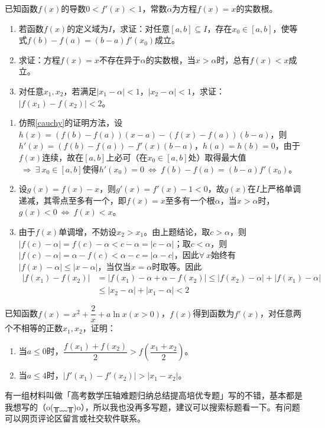 \begin{que}
	已知函数$f(x)$的导数$0<f'(x)<1$，常数$\alpha$为方程$f(x)=x$的实数根。
	\begin{enumerate}
		\item 若函数$f(x)$的定义域为$I$，求证：对任意$[a,b]\subseteq I$，存在$x_0\in[a,b]$，使等式$f(b)-f(a)=(b-a)f'(x_0)$成立。
		\item 求证：方程$f(x)=x$不存在异于$\alpha$的实数根，当$x>\alpha$时，总有$f(x)<x$成立。
		\item 对任意$x_1,x_2$，若满足$|x_1-\alpha|<1$，$|x_2-\alpha|<1$，求证：$|f(x_1)-f(x_2)|<2$。
	\end{enumerate}
\end{que}
\sol \begin{enumerate}
	\item 仿照\ref{cauchy}的证明方法，设$h(x)=(f(b)-f(a))(x-a)-(f(x)-f(a))(b-a)$，则$h'(x)=(f(b)-f(a))-f'(x)(b-a)$，$h(a)=h(b)=0$，由于$f(x)$连续，故在$[a,b]$上必可（在$x_0\in[a,b]$处）取得最大值$\ \Rightarrow\ \exists\ x_0\in[a,b]$使得$h'(x_0)=0\ \Leftrightarrow\ f(b)-f(a)=(b-a)f'(x_0)$。
	\item 设$g(x)=f(x)-x$，则$g'(x)=f'(x)-1<0$，故$g(x)$在$I$上严格单调递减，其零点至多有一个，即$f(x)=x$至多有一个根$\alpha$，当$x>\alpha$时，$g(x)<0\ \Leftrightarrow\ f(x)<x$。
	\item 由于$f(x)$单调增，不妨设$x_2>x_1$。由上题结论，取$c>\alpha$，则$|f(c)-\alpha|=f(c)-\alpha<c-\alpha=|c-\alpha|$；取$c<\alpha$，则$|f(c)-\alpha|=\alpha-f(c)<\alpha-c=|\alpha-c|$，因此$\forall\ x$始终有$|f(x)-\alpha|\leqslant |x-\alpha|$，当仅当$x=\alpha$时取等。因此$$\begin{aligned}
	|f(x_1)-f(x_2)|&=|f(x_1)-\alpha+\alpha-f(x_2)|\leqslant|f(x_2)-\alpha|+|f(x_1)-\alpha|\\&\leqslant|x_2-\alpha|+|x_1-\alpha|<2
	\end{aligned}$$
\end{enumerate}\par\hfill{}\easy

\begin{que}
	已知函数$f(x)=x^2+\dfrac{2}{x}+a\ln x(x>0)$，$f(x)$得到函数为$f'(x)$，对任意两个不相等的正数$x_1,x_2$，证明：\begin{enumerate}
		\item 当$a\leqslant 0$时，$\dfrac{f(x_1)+f(x_2)}{2}>f\left(\dfrac{x_1+x_2}{2}\right)$。
		\item 当$a\leqslant 4$时，$|f'(x_1)-f'(x_2)|>|x_1-x_2|$。
	\end{enumerate}
\end{que}\par\hfill\easy
\par\par
\begin{kaobox}[frametitle=Hint]
	有一组材料叫做「高考数学压轴难题归纳总结提高培优专题」写的不错，基本都是我想写的（o(╥﹏╥)o），所以我也没再多写题，建议可以搜索标题看一下。有问题可以网页评论区留言或社交软件联系。
\end{kaobox}
